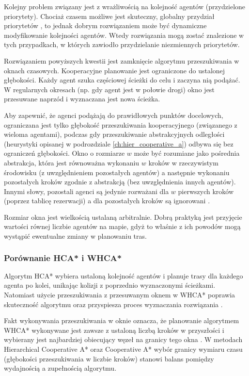 Kolejny problem związany jest z wrażliwością na kolejność agentów (przydzielone priorytety). Chociaż czasem możliwe jest skuteczny, globalny przydział priorytetów \cite{latombe}, to jednak dobrym rozwiązaniem może być dynamiczne modyfikowanie kolejności agentów. Wtedy rozwiązania mogą zostać znalezione w tych przypadkach, w których zawiodło przydzielanie niezmiennych priorytetów. \cite{cooppath}

Rozwiązaniem powyższych kwestii jest zamknięcie algorytmu przeszukiwania w oknach czasowych.
Kooperacyjne planowanie jest ograniczone do ustalonej głębokości. Każdy agent szuka częściowej ścieżki do celu i zaczyna nią podążać. W regularnych okresach (np. gdy agent jest w połowie drogi) okno jest przesuwane naprzód i wyznaczana jest nowa ścieżka.

Aby zapewnić, że agenci podążają do prawidłowych punktów docelowych, ograniczana jest tylko głębokość przeszukiwania kooperacyjnego (związanego z wieloma agentami), podczas gdy przeszukiwanie abstrakcyjnych odległości (heurystyki opisanej w podrozdziale \ref{ch:hier_cooperative_a}) odbywa się bez ograniczeń głębokości. Okno o rozmiarze $w$ może być rozumiane jako pośrednia abstrakcja, która jest równoważna wykonaniu $w$ kroków w rzeczywistym środowisku (z uwzględnieniem pozostałych agentów) a następnie wykonaniu pozostałych kroków zgodnie z abstrakcją (bez uwzględnienia innych agentów). Innymi słowy, pozostali agenci są jedynie rozważani dla $w$ pierwszych kroków (poprzez tablicę rezerwacji) a dla pozostałych kroków są ignorowani \cite{cooppath}.

Rozmiar okna jest wielkością ustalaną arbitralnie. Dobrą praktyką jest przyjęcie wartości równej liczbie agentów na mapie, gdyż to właśnie z ich powodów mogą wystąpić ewentualne zmiany w planowaniu tras.

\subsubsection{Porównanie HCA* i WHCA*}
Algorytm HCA* wybiera ustaloną kolejność agentów i planuje trasy dla każdego agenta po kolei, unikając kolizji z poprzednio wyznaczonymi ścieżkami. 
Natomiast użycie przeszukiwania z przesuwanym oknem w WHCA* poprawia skuteczność algorytmu oraz przyspiesza proces wyznaczania rozwiązania \cite{completealgo_standley}.

Fakt wykonywania przeszukiwania w oknie oznacza, że planowanie algorytmem WHCA* wykonywane jest zawsze z ustaloną liczbą kroków w przyszłości i wybierany jest najbardziej obiecujący węzeł na granicy tego okna \cite{rtcooppathfinding}. W metodach Hierarchical Cooperative A* oraz Cooperative A* wybór granicy wymiaru czasu (głębokości przeszukiwania w liczbie kroków) stanowi balans pomiędzy wydajnością a zupełnością algorytmu.

